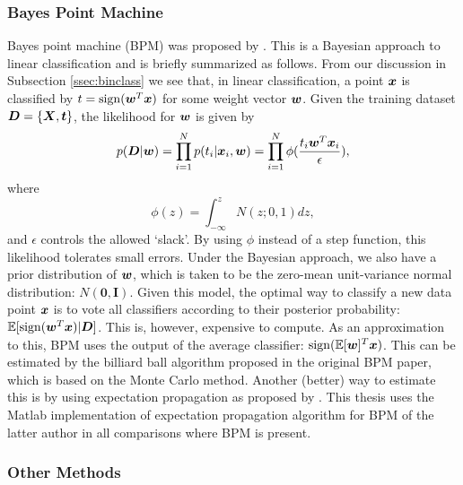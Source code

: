 \COMMENT

\subsubsection{Bayes Point Machine}

Bayes point machine (BPM) was proposed by \cite{Herbrich}. This is a
Bayesian approach to linear classification and is briefly summarized
as follows. From our discussion in Subsection \ref{ssec:binclass} we
see that, in linear classification, a point $\boldsymbol{x}$ is classified by $t =
\operatorname{sign}(\boldsymbol{w}^T \boldsymbol{x})$ for some weight vector $\boldsymbol{w}$. Given the training
dataset $\boldsymbol{D} = \{\boldsymbol{X}, \boldsymbol{t} \}$, the likelihood for $\boldsymbol{w}$ is given by
$$p(\boldsymbol{D} | \boldsymbol{w}) = \prod_{i=1}^N p(t_i | \boldsymbol{x}_i, \boldsymbol{w}) = \prod_{i=1}^N
\phi(\frac{t_i\boldsymbol{w}^T\boldsymbol{x}_i}{\epsilon}),$$ where
$$\phi(z) = \int_{-\infty}^z N(z; 0, 1) dz,$$ and $\epsilon$ controls
the allowed `slack'. By using $\phi$ instead of a step function, this
likelihood tolerates small errors. Under the Bayesian approach, we
also have a prior distribution of $\boldsymbol{w}$, which is taken to be the
zero-mean unit-variance normal distribution: $N(\boldsymbol{0,
  I})$. Given this model, the optimal way to classify a new data point
$\boldsymbol{x}$ is to vote all classifiers according to their posterior
probability: $\mathbb{E}[\operatorname{sign}(\boldsymbol{w}^T \boldsymbol{x}) | \boldsymbol{D}]$. This is, however,
expensive to compute. As an approximation to this, BPM uses the output
of the average classifier: $\operatorname{sign}(\mathbb{E}[\boldsymbol{w}] ^T \boldsymbol{x})$. This can be
estimated by the billiard ball algorithm proposed in the original BPM
paper, which is based on the Monte Carlo method. Another (better) way
to estimate this is by using expectation propagation as proposed by
\cite{bpm}. This thesis uses the Matlab implementation of expectation
propagation algorithm for BPM of the latter author in all comparisons
where BPM is present.

\subsubsection{Other Methods}

